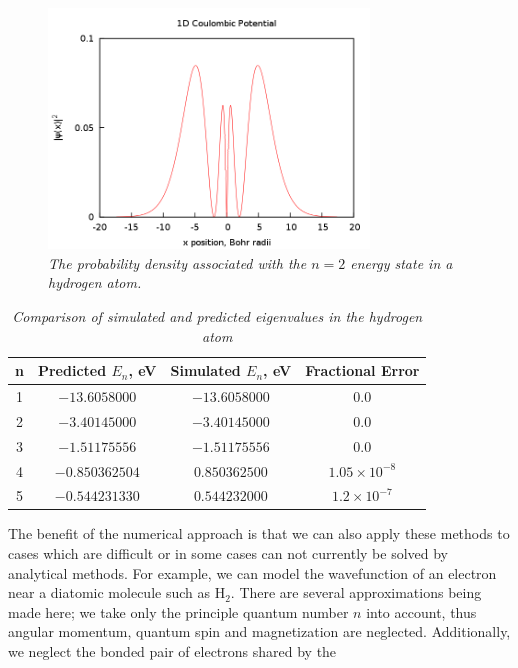 \documentclass[aps,prl,twocolumn,superscriptaddress]{revtex4-1}
\begin{document}
\begin{figure}[h!]
  \begin{center}
\centerline{\includegraphics[width=3.35in]{radial2n.png}}
\caption{\it \small{The probability density associated with the $n=2$ energy state in a hydrogen atom. \label{hydrogen}}}
  \end{center}
\end{figure}
\begin{table}[h!]
\label{data}
\begin{center}
\begin{tabular}{|c|c|c|c|} 
\hline
n  & Predicted $E_n$, eV  & Simulated $E_n$, eV   & Fractional Error \\
\hline\hline
1  & $-13.6058000$ & $-13.6058000$ & $0.0$\\
\hline
2  & $-3.40145000$ & $-3.40145000$ & $0.0$\\
\hline
3  & $-1.51175556$ & $-1.51175556$ & $0.0$\\
\hline
4  & $-0.850362504$ & $0.850362500$ & $1.05\times10^{-8}$\\
\hline
5  & $-0.544231330$ & $0.544232000$ & $1.2\times10^{-7}$\\
\hline
\end{tabular}
\caption{\it\small{Comparison of simulated and predicted eigenvalues in the hydrogen atom}}
\end{center}
\end{table}
\newpage
The benefit of the numerical approach is that we can also apply these methods to cases which are difficult or in some cases can not currently be solved by analytical methods. For example, we can model the wavefunction of an electron near a diatomic molecule such as H$_2$. There are several approximations being made here; we take only the principle quantum number $n$ into account, thus angular momentum, quantum spin and magnetization are neglected. Additionally, we neglect the bonded pair of electrons shared by the 
\end{document}
